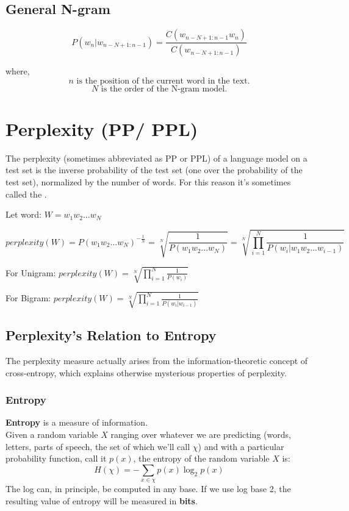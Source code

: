 \subsection{General N-gram \cite{nlp-1}}

\[
    P(w_n|w_{n-N+1:n-1}) = \displaystyle\frac{C(w_{n-N+1:n-1} w_n)}{C(w_{n-N+1:n-1})}
\]

where,
\[
    n \text{ is the position of the current word in the text.}
\]
\[
    N \text{ is the order of the N-gram model.}
\]


\section{Perplexity (PP/ PPL) \cite{nlp-1}}

The perplexity (sometimes abbreviated as PP or PPL) of a language model on a test set is the inverse probability of the test set (one over the probability of the test set), normalized by the number of words. For this reason it’s sometimes called the .

Let word: \(W = w_1w_2 ...w_N\)

\[
    perplexity(W) = P(w_1w_2 ...w_N)^{-\displaystyle\frac{1}{N}} = \sqrt[N]{\displaystyle\frac{1}{P(w_1w_2 ...w_N)}} = \sqrt[N]{\prod_{i=1}^{N} \displaystyle\frac{1}{P(w_i|w_1w_2 ...w_{i-1})}}
\]

For Unigram:
\(
   \displaystyle perplexity(W) = \sqrt[N]{\prod_{i=1}^{N} \displaystyle\frac{1}{P(w_i)}}
\)

\vspace{0.2cm}

For Bigram:
\(
   \displaystyle perplexity(W) = \sqrt[N]{\prod_{i=1}^{N} \displaystyle\frac{1}{P(w_i|w_{i-1})}}
\)

\subsection{Perplexity’s Relation to Entropy}
The perplexity measure actually arises from the information-theoretic concept of cross-entropy, which explains otherwise mysterious properties of perplexity.

\subsubsection{Entropy}\label{Entropy}
\textbf{Entropy} is a measure of information.\\
Given a random variable $X$ ranging over whatever we are predicting (words, letters, parts of speech, the set of which we’ll call $\chi$) and with a particular probability function, call it $p(x)$, the entropy of the random variable $X$ is:
\[
    \displaystyle H(\chi) = - \sum_{x \in \chi} p(x)\log_2p(x)
\]
The log can, in principle, be computed in any base. If we use log base 2, the
resulting value of entropy will be measured in \textbf{bits}.

